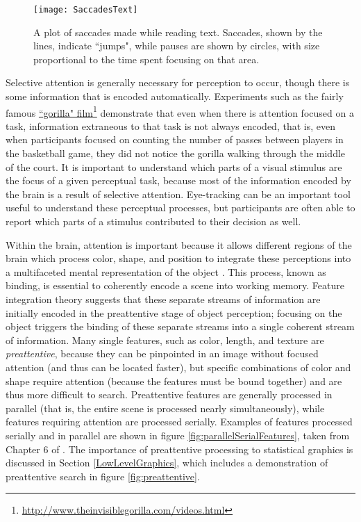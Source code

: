 \documentclass[11pt]{isuthesis}\usepackage[]{graphicx}\usepackage[]{color}
\begin{document}
\begin{figure}[htbp]
\centering
\texttt{[image: SaccadesText]}
\caption[Saccades and Pauses]{A plot of saccades made while reading text. Saccades, shown by the lines, indicate ``jumps", while pauses are shown by circles, with size proportional to the time spent focusing on that area.}\label{fig:saccadestext}
\end{figure}

Selective attention is generally necessary for perception to occur, though there is some information that is encoded automatically. Experiments such as the fairly famous \href{http://www.theinvisiblegorilla.com/videos.html}{``gorilla" film}\footnote{\url{http://www.theinvisiblegorilla.com/videos.html}} demonstrate that even when there is attention focused on a task, information extraneous to that task is not always encoded, that is, even when participants focused on counting the number of passes between players in the basketball game, they did not notice the gorilla walking through the middle of the court. It is important to understand which parts of a visual stimulus are the focus of a given perceptual task, because most of the information encoded by the brain is a result of selective attention. Eye-tracking can be an important tool useful to understand these perceptual processes, but participants are often able to report which parts of a stimulus contributed to their decision as well.

Within the brain, attention is important because it allows different regions of the brain which process color, shape, and position to integrate these perceptions into a multifaceted mental representation of the object \citep{goldstein}. This process, known as binding, is essential to coherently encode a scene into working memory. Feature integration theory \citep{treisman1980feature} suggests that these separate streams of information are initially encoded in the preattentive stage of object perception; focusing on the object triggers the binding of these separate streams into a single coherent stream of information. Many single features, such as color, length, and texture are \emph{preattentive}, because they can be pinpointed in an image without focused attention (and thus can be located faster), but specific combinations of color and shape require attention (because the features must be bound together) and are thus more difficult to search. Preattentive features are generally processed in parallel (that is, the entire scene is processed nearly simultaneously), while features requiring attention are processed serially. Examples of features processed  serially and in parallel are shown in figure \ref{fig:parallelSerialFeatures}, taken from Chapter 6 of \citet{helander1997handbook}. The importance of preattentive processing to statistical graphics is discussed in Section \ref{LowLevelGraphics}, which includes a demonstration of preattentive search in figure \ref{fig:preattentive}. 
\end{document}
